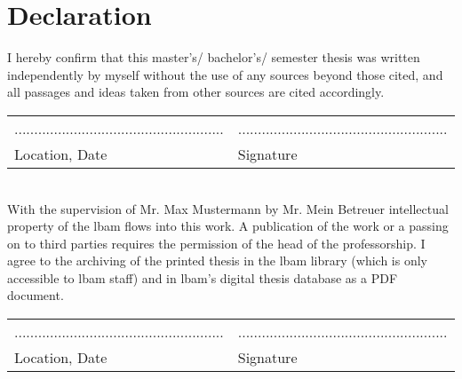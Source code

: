 \chapter*{Declaration}
I hereby confirm that this master's/ bachelor's/ semester thesis was written independently by myself without the use of any sources beyond those cited, and all passages and ideas taken from other sources are cited accordingly.%
%
\vspace{5cm}\\
\begin{tabular}{p{0.5\linewidth}p{0.5\linewidth} }
	.....................................................		& .....................................................\\
	Location, Date  	& Signature
\end{tabular}
%
\vspace{2cm}\\
%
With the supervision of Mr. Max Mustermann by Mr. Mein Betreuer intellectual property of the \gls{lbam}  flows into this work. A publication of the work or a passing on to third parties requires the permission of the head of the professorship. I agree to the archiving of the printed thesis in the  \gls{lbam} library (which is only accessible to \gls{lbam} staff) and in \gls{lbam}'s digital thesis database as a PDF document.%
%
\vfill
%
\begin{tabular}{p{0.5\linewidth}p{0.5\linewidth} }
	.....................................................		& .....................................................\\
    Location, Date  	& Signature
\end{tabular}

